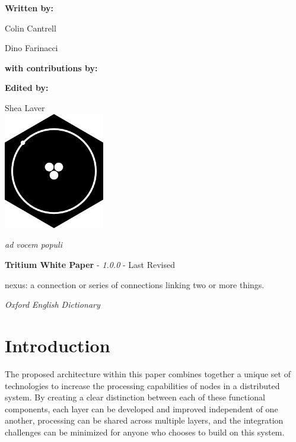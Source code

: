 \documentclass[11pt]{article}
\newcommand{\maketitlepage}[3]{
  \begingroup
  \centering
  
  \vspace*{2\baselineskip}
  
  \textbf{Written by:}\par
  \medskip
  Colin Cantrell\par
  Dino Farinacci\par

  \vspace*{2\baselineskip}

  \textbf{with contributions by:}\par\medskip
  \renewcommand\do[1]{%
    {
    \usevalue ##1:firstname \space \usevalue ##1:lastname \par}%
    }
  \docsvlist{#1}
  \vspace*{2\baselineskip}
  
  \textbf{Edited by:}\par
  \medskip
  Shea Laver
  \\
  \vspace*{3\baselineskip}
  \includegraphics[width=0.33\textwidth]{./rsz_tritium.png}
  \vspace*{1\baselineskip}
  
\begin{center}
\textit{ad vocem populi}
\end{center}  
  \pagebreak
  \endgroup
}
\begin{document}
\title{\rmfamily{}}

\date {\usvardate {}}
\maketitle
\begin{abstract}
\begin{center}
\bigskip
\noindent \textit{``Humility is the solid foundation of all virtues"}
\end{center}

\begin{flushright}
Confucius
\end{flushright}
\bigskip

\noindent Blockchain is a flourishing technology that is in a constant state of change.
Nexus is pioneering a new approach to Blockchain technology that solves the biggest challenges faced by the industry, \textbf{\textit{viz.}} scalability, ease of integration, and intuitive user experience.
Beginning with the Tritium update, we are creating an innovative software stack containing multiple layers of abstraction that will streamline business integration into the Nexus framework, form the foundation of a cryptographic identity system, and make smart contracts easily accessible through a feature-rich API set.
Each API call will be developed through a standardization process, with input from businesses, industry leaders and developers, focused on providing a well-designed interface and seamless business integration.

\end{abstract}

\newpage

\tableofcontents
\newpage
\maketitlepage{Shea, Jules, Smith, April, Steve}
\newpage


\paragraph{\textbf{Tritium White Paper} - \textit{1.0.0} - Last Revised \date {}  }

\epigraph{nexus: a connection or series of connections linking two or more things.}{\textit{\footnotesize{Oxford English Dictionary}}}
\section{Introduction}

The proposed architecture within this paper combines together a unique set of technologies to increase the processing capabilities of nodes in a distributed system.
By creating a clear distinction between each of these functional components, each layer can be developed and improved independent of one another, processing can be shared across multiple layers, and the integration challenges can be minimized for anyone who chooses to build on this system.
\end{document}
